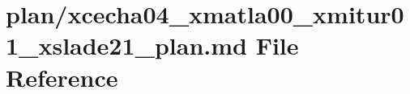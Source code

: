 \hypertarget{xcecha04__xmatla00__xmitur01__xslade21__plan_8md}{}\section{plan/xcecha04\+\_\+xmatla00\+\_\+xmitur01\+\_\+xslade21\+\_\+plan.md File Reference}
\label{xcecha04__xmatla00__xmitur01__xslade21__plan_8md}
